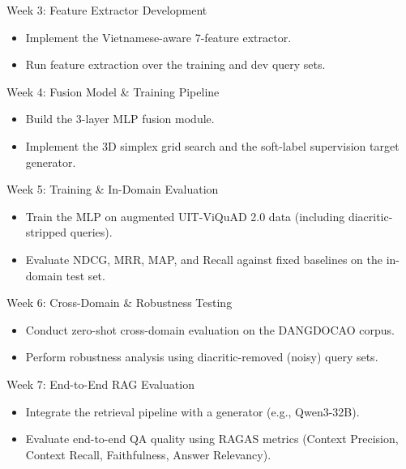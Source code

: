 \documentclass[11pt,a4paper]{article}
\begin{document}
\begin{timelinebox}{Week 3: Feature Extractor Development}
\begin{itemize}[leftmargin=*,nosep]
    \item Implement the Vietnamese-aware 7-feature extractor.
    \item Run feature extraction over the training and dev query sets.
\end{itemize}
\end{timelinebox}

\begin{timelinebox}{Week 4: Fusion Model \& Training Pipeline}
\begin{itemize}[leftmargin=*,nosep]
    \item Build the 3-layer MLP fusion module.
    \item Implement the 3D simplex grid search and the soft-label supervision target generator.
\end{itemize}
\end{timelinebox}

\begin{timelinebox}{Week 5: Training \& In-Domain Evaluation}
\begin{itemize}[leftmargin=*,nosep]
    \item Train the MLP on augmented UIT-ViQuAD 2.0 data (including diacritic-stripped queries).
    \item Evaluate NDCG, MRR, MAP, and Recall against fixed baselines on the in-domain test set.
\end{itemize}
\end{timelinebox}

\begin{timelinebox}{Week 6: Cross-Domain \& Robustness Testing}
\begin{itemize}[leftmargin=*,nosep]
    \item Conduct zero-shot cross-domain evaluation on the DANGDOCAO corpus.
    \item Perform robustness analysis using diacritic-removed (noisy) query sets.
\end{itemize}
\end{timelinebox}

\begin{timelinebox}{Week 7: End-to-End RAG Evaluation}
\begin{itemize}[leftmargin=*,nosep]
    \item Integrate the retrieval pipeline with a generator (e.g., Qwen3-32B).
    \item Evaluate end-to-end QA quality using RAGAS metrics (Context Precision, Context Recall, Faithfulness, Answer Relevancy).
\end{itemize}
\end{timelinebox}
\end{document}
